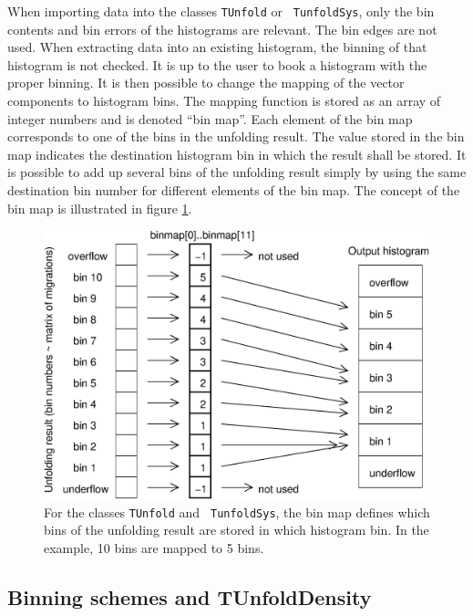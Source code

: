 \documentclass[12pt]{article}
\newlength{\figwidth}
\begin{document}
When importing data into the classes {\tt TUnfold} or {\tt
  TunfoldSys}, only the bin contents and bin errors of the histograms
are relevant. The bin edges are not used.
When extracting data into an existing histogram, the binning of
that histogram is not checked. It is up to the user to book a histogram
with the proper binning. It is then possible to change
the mapping of the vector components to histogram bins. The mapping
function is stored as an array of integer numbers and is denoted
``bin map''. Each element of the bin map corresponds to one of the bins
in the unfolding result. The value stored in the bin map indicates the
destination histogram bin in which the result shall be stored. It is
possible to add up several bins of the unfolding result simply by
using the same destination bin number for different elements of the
bin map. The concept of the bin map is illustrated in figure \ref{fig:binmap}.
\begin{figure}
\begin{center}
\includegraphics[width=0.7\figwidth]{tunfold_manual_fig1.eps}
\end{center}
\caption{\label{fig:binmap} For the classes {\tt TUnfold} and {\tt
  TunfoldSys}, the bin map defines which bins of the unfolding result
are stored in which histogram bin. In the example, 10 bins are mapped
to 5 bins.}
\end{figure}

\subsection{Binning schemes and TUnfoldDensity}
\end{document}
